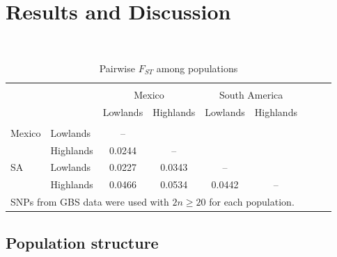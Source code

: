 \section*{Results and Discussion}


\renewcommand{\arraystretch}{1.1}
\begin{table}[tb]

\begin{center}
 \caption[]{Pairwise $F_{ST}$ among populations \hspace*{2.3cm}}
  \textbf{}\\[-2mm]
{\fontsize{7}{9}\sf
    \begin{tabular}{llccccccl}
    \hline
    & & \\[-3mm]
	&		&	\multicolumn{2}{c}{Mexico}		&	\multicolumn{2}{c}{South America}		\\
	&		&	Lowlands	&	Highlands	&	Lowlands	&	Highlands	\\
      \hline
    & & \\[-3mm]
Mexico	&	Lowlands	&	--	&		&		&		\\
	&	Highlands	&	0.0244	&	--	&		&		\\
SA	&	Lowlands	&	0.0227	&	0.0343	&	--	&		\\
	&	Highlands	&	0.0466	&	0.0534	&	0.0442	&	--	\\ [1mm]
    \hline
	\multicolumn{6}{l}{SNPs from GBS data were used with $2n\geq20$ for each population.}

    \end{tabular}
    \label{FstP}  %
}
\end{center}
\end{table}
\renewcommand{\arraystretch}{1}

\subsection*{Population structure}

